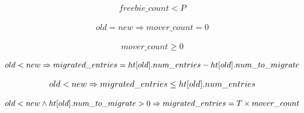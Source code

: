 \begin{lemma}
  \begin{equation*}
\begin{array}{l}        
  freebie\_count < P
\end{array}
  \end{equation*}  
  \label{did_not_pay_ub}    
\end{lemma}  

\begin{lemma}
  \begin{equation*}
\begin{array}{l}        
  old = new \Rightarrow mover\_count = 0
\end{array}
  \end{equation*} 
  \label{paid_tax0}    
\end{lemma}  

\begin{lemma}        
  \begin{equation*}
\begin{array}{l}
  mover\_count \geq 0
\end{array}
\end{equation*}
  \label{paid_tax1}  
\end{lemma}


\begin{lemma}
  \begin{equation*}
\begin{array}{l}        
  old < new \Rightarrow migrated\_entries = \mbox{$ht[old]$}.num\_entries - \mbox{$ht[old]$}.num\_to\_migrate
\end{array}
\end{equation*}  
  \label{revenue1}    
\end{lemma}

\begin{lemma}
  \begin{equation*}
\begin{array}{l}        
  old < new \Rightarrow migrated\_entries \leq \mbox{$ht[old]$}.num\_entries
\end{array}
\end{equation*}
  \label{revenue2}    
\end{lemma}

\begin{lemma}
    \begin{equation*}
\begin{array}{l}      
  old < new \wedge \mbox{$ht[old]$}.num\_to\_migrate > 0 \Rightarrow migrated\_entries = T \times mover\_count
\end{array}
    \end{equation*}  
    \label{revenue3}    
\end{lemma}

